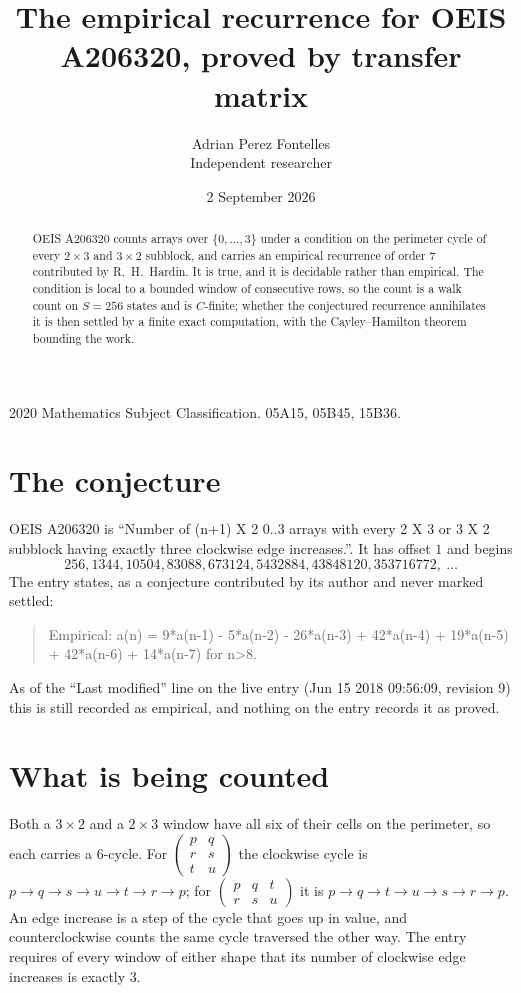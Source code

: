 \documentclass[11pt,a4paper]{article}
\title{The empirical recurrence for OEIS A206320, proved by transfer matrix}
\author{Adrian Perez Fontelles\\ \small Independent researcher}
\date{2 September 2026}
\theoremstyle{plain}
\theoremstyle{definition}
\begin{document}
\maketitle

\begin{abstract}
OEIS A206320 counts arrays over $\{0,\dots,3\}$ under a condition on the perimeter cycle of
every $2\times3$ and $3\times2$ subblock, and carries an empirical recurrence of order $7$ contributed by
R.~H.~Hardin. It is true, and it is decidable rather than empirical. The condition is local to
a bounded window of consecutive rows, so the count is a walk count on $S=256$ states and is
$C$-finite; whether the conjectured recurrence annihilates it is then settled by a finite exact
computation, with the Cayley--Hamilton theorem bounding the work.
\end{abstract}

\noindent\small 2020 Mathematics Subject Classification. 05A15, 05B45, 15B36.\normalsize

\section{The conjecture}

OEIS A206320 is ``Number of (n+1) X 2 0..3 arrays with every 2 X 3 or 3 X 2 subblock having exactly three clockwise edge increases.''. It has offset $1$ and begins
\[
256, 1344, 10504, 83088, 673124, 5432884, 43848120, 353716772,\ \dots
\]
The entry states, as a conjecture contributed by its author and never marked settled:
\begin{quote}
Empirical: a(n) = 9*a(n-1) - 5*a(n-2) - 26*a(n-3) + 42*a(n-4) + 19*a(n-5) + 42*a(n-6) + 14*a(n-7) for n>8.
\end{quote}
As of the ``Last modified'' line on the live entry (Jun 15 2018 09:56:09, revision 9) this is still
recorded as empirical, and nothing on the entry records it as proved.

\section{What is being counted}

Both a $3\times2$ and a $2\times3$ window have all six of their cells on the
perimeter, so each carries a $6$-cycle. For
$\begin{pmatrix}p&q\\r&s\\t&u\end{pmatrix}$ the clockwise cycle is
$p\to q\to s\to u\to t\to r\to p$; for
$\begin{pmatrix}p&q&t\\r&s&u\end{pmatrix}$ it is
$p\to q\to t\to u\to s\to r\to p$. An edge increase is a step of the cycle that goes up in
value, and counterclockwise counts the same cycle traversed the other way. The entry requires
of every window of either shape that its number of clockwise edge increases is exactly $3$.
\end{document}
